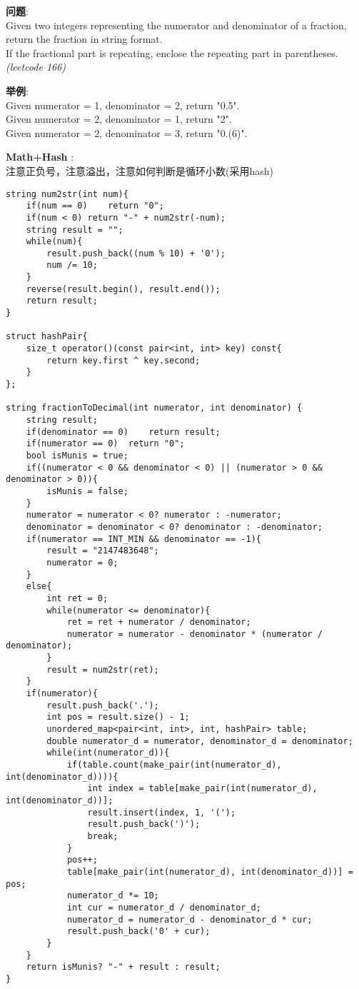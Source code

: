     
\begin{description}
    \item{\textbf{问题}}:\\
Given two integers representing the numerator and denominator of a fraction, return the fraction in string format.\\
If the fractional part is repeating, enclose the repeating part in parentheses.\\
\textit{(leetcode 166)}
    \item{\textbf{举例}}:\\
Given numerator = 1, denominator = 2, return "0.5".\\
Given numerator = 2, denominator = 1, return "2".\\
Given numerator = 2, denominator = 3, return "0.(6)".
    \item{\textbf{Math+Hash}} : 
    \\注意正负号，注意溢出，注意如何判断是循环小数(采用hash)
    \begin{lstlisting}
string num2str(int num){
	if(num == 0)	return "0";
	if(num < 0)	return "-" + num2str(-num);
	string result = "";
	while(num){
		result.push_back((num % 10) + '0');
		num /= 10;
	}
	reverse(result.begin(), result.end());
	return result;
}

struct hashPair{
	size_t operator()(const pair<int, int> key) const{
		return key.first ^ key.second;
	}
};

string fractionToDecimal(int numerator, int denominator) {
	string result;
	if(denominator == 0)	return result;
	if(numerator == 0)	return "0";
	bool isMunis = true;
	if((numerator < 0 && denominator < 0) || (numerator > 0 && denominator > 0)){
		isMunis = false;
	}
	numerator = numerator < 0? numerator : -numerator;
	denominator = denominator < 0? denominator : -denominator;
	if(numerator == INT_MIN && denominator == -1){
		result = "2147483648";
		numerator = 0;
	}
	else{
		int ret = 0;
		while(numerator <= denominator){
			ret = ret + numerator / denominator;
			numerator = numerator - denominator * (numerator / denominator);
		}
		result = num2str(ret);
	}
	if(numerator){
		result.push_back('.');
		int pos = result.size() - 1;
		unordered_map<pair<int, int>, int, hashPair> table;
		double numerator_d = numerator, denominator_d = denominator;
		while(int(numerator_d)){
			if(table.count(make_pair(int(numerator_d), int(denominator_d)))){
				int index = table[make_pair(int(numerator_d), int(denominator_d))];
				result.insert(index, 1, '(');
				result.push_back(')');
				break;
			}
			pos++;
			table[make_pair(int(numerator_d), int(denominator_d))] = pos;
			numerator_d *= 10;
			int cur = numerator_d / denominator_d;
			numerator_d = numerator_d - denominator_d * cur;
			result.push_back('0' + cur);
		}
	}
	return isMunis? "-" + result : result;
}
    \end{lstlisting}
\end{description}
